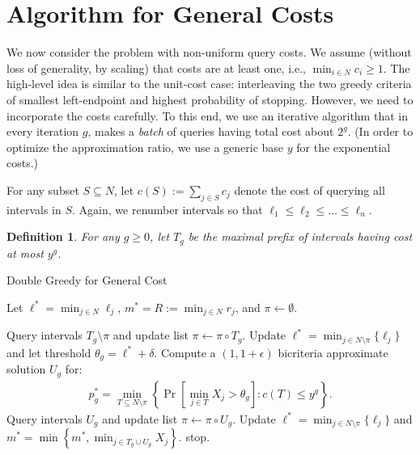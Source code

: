 \documentclass[11pt]{article}
\newcommand{\base}{y}
\newtheorem{defn}[thm]{Definition}
\theoremstyle{remark}
\theoremstyle{plain}
\theoremstyle{remark}
\begin{document}
\def\i{g}  \section{Algorithm for  General Costs}


We now consider the \smq problem with non-uniform query costs. We assume (without loss of generality, by scaling) that  costs are at least one, i.e., $\min_{i\in N} c_i\ge 1$. The high-level idea is similar to 
the unit-cost case: interleaving the two greedy criteria of smallest left-endpoint and highest probability of stopping. However, we need to incorporate the costs carefully. To this end, we use an iterative algorithm that in every iteration $\i$, makes  a {\em batch} of queries having total cost about $2^\i$. (In order to optimize the approximation ratio, we use a generic base $\base$ for the exponential costs.)   





For any subset $S\subseteq N$, let $c(S):=\sum_{j\in S} c_j$ denote the cost of querying all  intervals in $S$.  Again, we renumber intervals so that $\ell_1\le \ell_2\le \dots \le \ell_n$.

\begin{defn}
For any $\i\ge 0$, let $T_\i$ be the maximal prefix of intervals having cost at most $ {\base}^\i$.
\end{defn}




\begin{algorithm} 
\label{alg:grd-gen}
\caption{Double Greedy for General Cost \label{pol:gengreedy}}
\begin{algorithmic}[1]
\State Let $\ell^* = \min_{j \in N} \ell_j$, $m^* = R:=\min_{j\in N} r_j$,  and $\pi\gets \emptyset$.
\For{$ \i =0, 1, 2, \dots,$} 

    \State \label{alg:step-a}  Query intervals $T_\i\setminus \pi$ and update list $\pi \gets \pi \circ T_\i$.
    \State \label{alg:step-theta} Update $\ell^* = \min_{j \in N \setminus \pi }\{\ell_j\}$ and   let threshold $\theta_\i = \ell^* + \delta$. 
    \State \label{alg:step-knap} Compute a $(1,1+\epsilon)$ bicriteria approximate solution  $U_\i$  for: 
    \begin{align}
    p^*_\i = \min_{T \subseteq N \setminus \pi } \left\{\Pr\left[ \min_{j \in T} X_j >  \theta_\i \right] : c(T) \leq {\base}^\i\right\}. \tag{KP}\label{eq:algknap}
    \end{align}
    \State \label{alg:step-b}  Query intervals $U_\i$ and update list $\pi \gets \pi \circ  U_\i$.
    \State Update $\ell^* = \min_{j \in N \setminus \pi }\{\ell_j\}$ and  $m^*=\min\left\{m^*, \min_{j\in T_\i\cup U_\i} X_j\right\}$. 
    stop. \EndIf
\EndFor
\end{algorithmic}
\end{algorithm}
\end{document}
